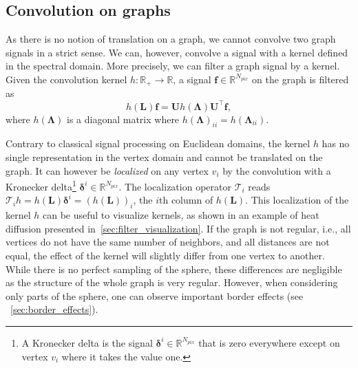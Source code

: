 \documentclass[final,twocolumn,3p,times,sort&compress]{elsarticle}
\renewcommand{\b}[1]{{\bm{#1}}}   %
\newcommand{\1}{\b{1}}              %
\newcommand{\0}{\b{0}}              %
\renewcommand{\L}{\b{L}}
\newcommand{\U}{\b{U}}
\newcommand{\f}{\b{f}}
\newcommand{\trans}{^\intercal}
\newcommand{\R}{\mathbb{R}}
\newcommand{\bLambda}{\b{\Lambda}}
\newcommand{\T}{\mathcal{T}}
\begin{document}
\subsection{Convolution on graphs}
\label{sec:graph_convolution}

As there is no notion of translation on a graph, we cannot convolve two graph signals in a strict sense.
We can, however, convolve a signal with a kernel defined in the spectral domain.
More precisely, we can filter a graph signal by a kernel.
Given the convolution kernel
$h: \R_+ \rightarrow \R$, a signal $\f \in \R^{N_{pix}}$ on the graph is filtered as
\begin{equation} \label{eqn:graph_convolution_fourier}
	h(\L) \f = \U h(\bLambda) \U\trans \f,
\end{equation}
where $h(\bLambda)$ is a diagonal matrix where $h(\bLambda)_{ii} = h(\bLambda_{ii})$.

Contrary to classical signal processing on Euclidean domains, the kernel $h$ has no single representation in the vertex domain and cannot be translated on the graph. It can however be \textit{localized} on any vertex $v_i$ by the convolution with a Kronecker delta\footnote{A Kronecker delta is the signal $\b \delta^i \in \R^{N_{pix}}$ that is zero everywhere except on vertex $v_i$ where it takes the value one.} $\b \delta^i \in \R^{N_{pix}}$. The localization operator $\T_i$ reads $\T_i h = h(\L) \b \delta^i = (h(\L))_i$, the $i$th column of $h(\L)$.
This localization of the kernel $h$ can be useful to visualize kernels, as shown in an example of heat diffusion presented in~\ref{sec:filter_visualization}.
If the graph is not regular, i.e., all vertices do not have the same number of neighbors, and all distances are not equal, the effect of the kernel will slightly differ from one vertex to another. While there is no perfect sampling of the sphere, these differences are negligible as the structure of the whole graph is very regular. However, when considering only parts of the sphere, one can observe important border effects (see ~\ref{sec:border_effects}).
\end{document}
